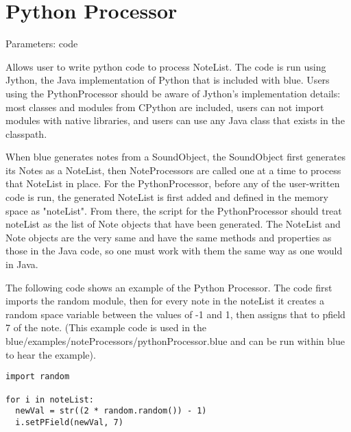 \section{Python Processor}\label{pythonProcessor}

Parameters: code

Allows user to write python code to process NoteList. The code is run
using Jython, the Java implementation of Python that is included with
blue. Users using the PythonProcessor should be aware of Jython's
implementation details: most classes and modules from CPython are
included, users can not import modules with native libraries, and users
can use any Java class that exists in the classpath.

When blue generates notes from a SoundObject, the SoundObject first
generates its Notes as a NoteList, then NoteProcessors are called one at
a time to process that NoteList in place. For the PythonProcessor,
before any of the user-written code is run, the generated NoteList is
first added and defined in the memory space as "noteList". From there,
the script for the PythonProcessor should treat noteList as the list of
Note objects that have been generated. The NoteList and Note objects are
the very same and have the same methods and properties as those in the
Java code, so one must work with them the same way as one would in Java.

The following code shows an example of the Python Processor. The code
first imports the random module, then for every note in the noteList it
creates a random space variable between the values of -1 and 1, then
assigns that to pfield 7 of the note. (This example code is used in the
blue/examples/noteProcessors/pythonProcessor.blue and can be run within
blue to hear the example).

\begin{verbatim}
import random

for i in noteList:
  newVal = str((2 * random.random()) - 1)
  i.setPField(newVal, 7)
\end{verbatim}
